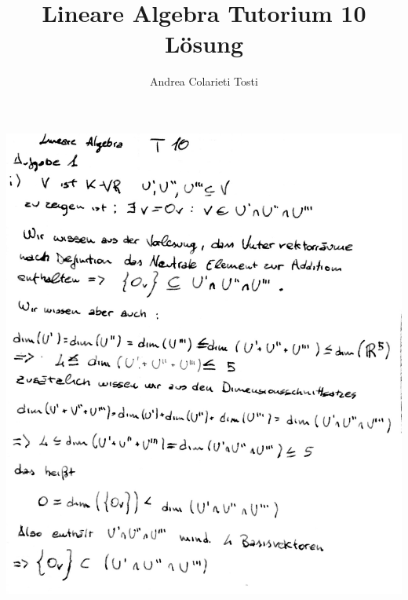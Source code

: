 \documentclass[10pt,a4paper]{article}
\author{Andrea Colarieti Tosti}
\title{Lineare Algebra Tutorium 10 Lösung}
\begin{document}
\maketitle

\includegraphics[scale=0.25]{lat1_1.jpg} \\
\end{document}
